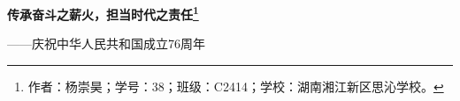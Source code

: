 \documentclass[UTF8,12pt,twoside]{article}
\begin{document}
\begin{spacing}{0} %
    \begin{center}
        \LARGE{\textbf{\textsf{传承奋斗之薪火，担当时代之责任\footnote{作者：杨崇昊；学号：38；班级：C2414；学校：湖南湘江新区思沁学校。}}}}
    \end{center}
    \begin{flushright}
        \large{\textsf{——庆祝中华人民共和国成立76周年}}
    \end{flushright}
\end{spacing}
\vspace{3em}

\pagestyle{fancy}
\fancyhf{} %
\fancyfoot[LE]{\thepage}
\fancyfoot[RO]{\thepage}

\end{document}
